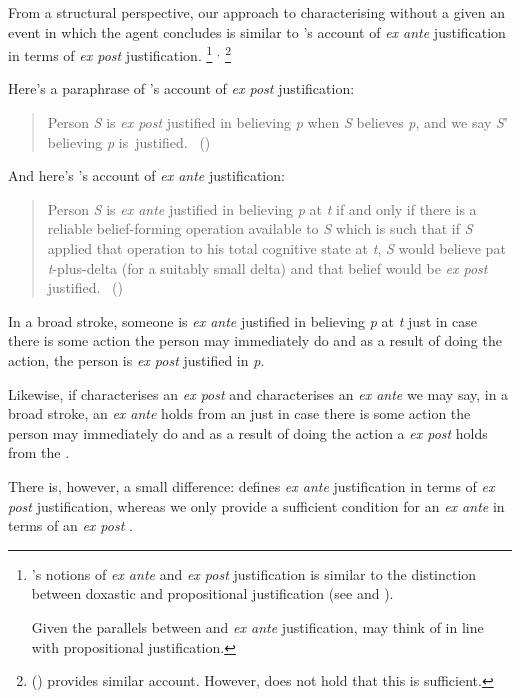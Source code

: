 \begin{note}
  From a structural perspective, our approach to characterising  without a given an event in which the agent concludes is similar to \citeauthor{Goldman:1979ui}'s account of \emph{ex ante} justification in terms of \emph{ex post} justification.%
  \footnote{
    \citeauthor{Goldman:1979ui}'s notions of \emph{ex ante} and \emph{ex post} justification is similar to the distinction between doxastic and propositional justification (see \cite{Firth:1978vi} and \cite[esp.\ fn.1]{Silva:2020aa}).

    Given the parallels between  and \emph{ex ante} justification, may think of  in line with propositional justification.
  }%
  \(^{,}\)%
  \footnote{
    \citeauthor{Turri:2010aa} (\citeyear{Turri:2010aa}) provides similar account.
    However, \citeauthor{Turri:2010aa} does not hold that this is sufficient.
  }

  Here's a paraphrase of \citeauthor{Goldman:1979ui}'s account of \emph{ex post} justification:
  \begin{quote}
    Person \emph{S} is \emph{ex post} justified in believing \emph{p} when \emph{S} believes \emph{p}, and we say \emph{S}' believing \emph{p} is~justified.%
    \mbox{ }\hfill\mbox{(\citeyear[Cf.][21]{Goldman:1979ui})}
  \end{quote}
  And here's \citeauthor{Goldman:1979ui}'s account of \emph{ex ante} justification:
  \begin{quote}
    Person \emph{S} is \emph{ex ante} justified in believing \emph{p} at \emph{t} if and only if there is a reliable belief-forming operation available to \emph{S} which is such that if \emph{S} applied that operation to his total cognitive state at \emph{t}, \emph{S} would believe pat \emph{t}-plus-delta (for a suitably small delta) and that belief would be \emph{ex post} justified.%
    \mbox{ }\hfill\mbox{(\citeyear[21]{Goldman:1979ui})}
  \end{quote}
  In a broad stroke, someone is \emph{ex ante} justified in believing \emph{p} at \emph{t} just in case there is some action the person may immediately do and as a result of doing the action, the person is \emph{ex post} justified in \emph{p}.

  Likewise, if \support{} characterises an \emph{ex post}  and \supportII{} characterises an \emph{ex ante}  we may say, in a broad stroke, an \emph{ex ante} \ros{} holds from an \agpe{} just in case there is some action the person may immediately do and as a result of doing the action a \emph{ex post} \ros{} holds from the \agpe{}.

  There is, however, a small difference:
  \citeauthor{Goldman:1979ui} defines \emph{ex ante} justification in terms of \emph{ex post} justification, whereas we only provide a sufficient condition for an \emph{ex ante} \ros{} in terms of an \emph{ex post} \ros{}.
\end{note}



